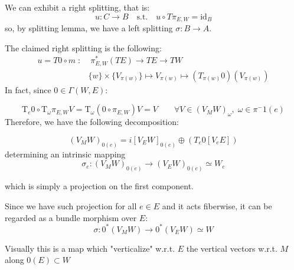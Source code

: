 \documentclass[a4paper,12pt,fleqn]{scrartcl}  %
\begin{document}
We can exhibit a right splitting, that is:
\begin{displaymath}
	u : C \rightarrow B \quad \textrm{s.t.} \quad u \circ T \pi_{E,W} = \textrm{id}_B
\end{displaymath}
so, by splitting lemma, we have a left splitting $\sigma : B \rightarrow A$.

The claimed right splitting is the following:
\begin{align*}
		u = T0 \circ m \; : & \; \pi^\ast_{E,W} \left(TE \right) \rightarrow TE \rightarrow TW \\
						& \{w\} \times \{V_{\pi(w)} \} \mapsto V_{\pi(w)} \mapsto \left( T_{\pi(w)}0\right) (V_{\pi(w)})
\end{align*}
In fact, since $0 \in \Gamma (W,E)$:

\begin{displaymath}
	\textrm{T}_e 0 \circ \textrm{T}_\omega \pi_{E,W} V =
	\textrm{T}_\omega \left( 0 \circ \pi_{E,W} \right) V = 
	V \qquad \forall V \in \left( V_M W \right)_\omega ,\; \omega \in \pi^-1(e)
\end{displaymath}
Therefore, we have the following decomposition:

\begin{displaymath}
	\left( V_M W \right)_{0(e)} = 
	i\left[ V_E W \right]_{0(e)} \oplus \left( T_e 0 \left[ V_e E\right] \right)
\end{displaymath}
determining an intrinsic mapping 
\begin{displaymath}
	\sigma_e : \left( V_M W \right)_{0(e)} \rightarrow \left( V_E W \right)_{0(e)} \simeq W_e
\end{displaymath}

which is simply a  projection on the first component.

Since we have such projection for all $e \in E$ and it acts fiberwise, it can be regarded as a bundle morphism over $E$:
\begin{displaymath}
	\sigma : 0^\ast \left( V_M W \right) \rightarrow 0^\ast \left( V_E W \right) \simeq W
\end{displaymath} 

\begin{figure}
\centering
  
\end{figure}
Visually this is a map which "verticalize" w.r.t. $E$ the vertical vectors w.r.t. $M$ along $0(E) \subset W$

\begin{figure}
  \centering
    
\end{figure}
\end{document}
